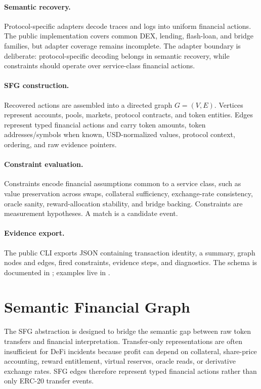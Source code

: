 \documentclass[10pt]{article}
\begin{document}
\paragraph{Semantic recovery.}
Protocol-specific adapters decode traces and logs into uniform financial
actions. The public implementation covers common DEX, lending, flash-loan, and
bridge families, but adapter coverage remains incomplete. The adapter boundary
is deliberate: protocol-specific decoding belongs in semantic recovery, while
constraints should operate over service-class financial actions.

\paragraph{SFG construction.}
Recovered actions are assembled into a directed graph \(G=(V,E)\). Vertices
represent accounts, pools, markets, protocol contracts, and token entities.
Edges represent typed financial actions and carry token amounts, token
addresses/symbols when known, USD-normalized values, protocol context,
ordering, and raw evidence pointers.

\paragraph{Constraint evaluation.}
Constraints encode financial assumptions common to a service class, such as
value preservation across swaps, collateral sufficiency, exchange-rate
consistency, oracle sanity, reward-allocation stability, and bridge backing.
Constraints are measurement hypotheses. A match is a candidate event.

\paragraph{Evidence export.}
The public CLI exports JSON containing transaction identity, a summary, graph
nodes and edges, fired constraints, evidence steps, and diagnostics. The schema
is documented in ; examples
live in .

\section{Semantic Financial Graph}
\label{sec:sfg}

The SFG abstraction is designed to bridge the semantic gap between raw token
transfers and financial interpretation. Transfer-only representations are often
insufficient for DeFi incidents because profit can depend on collateral,
share-price accounting, reward entitlement, virtual reserves, oracle reads, or
derivative exchange rates. SFG edges therefore represent typed financial
actions rather than only ERC-20 transfer events.
\end{document}
